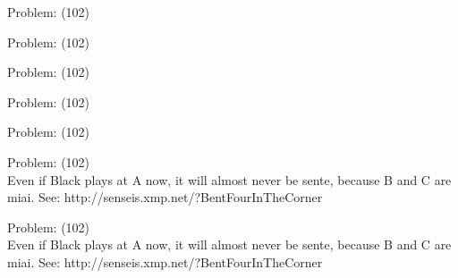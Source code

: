 \documentclass[11pt]{article}
\begin{document}
\begin{minipage}[t]{0.5\textwidth}
  {\centering
  
Problem: (102)\\
  }
\end{minipage}
\begin{minipage}[t]{0.5\textwidth}
  {\centering
  
Problem: (102)\\
  }
\end{minipage}
\begin{minipage}[t]{0.5\textwidth}
  {\centering
  
Problem: (102)\\
  }
\end{minipage}
\begin{minipage}[t]{0.5\textwidth}
  {\centering
  
Problem: (102)\\
  }
\end{minipage}
\begin{minipage}[t]{0.5\textwidth}
  {\centering
  
Problem: (102)\\
  }
\end{minipage}
\begin{minipage}[t]{0.5\textwidth}
  {\centering
  
Problem: (102)\\
Even if Black plays at A now, it will almost never be sente, because B and C are miai. See: http://senseis.xmp.net/?BentFourInTheCorner\\
  }
\end{minipage}
\begin{minipage}[t]{0.5\textwidth}
  {\centering
  
Problem: (102)\\
Even if Black plays at A now, it will almost never be sente, because B and C are miai. See: http://senseis.xmp.net/?BentFourInTheCorner\\
  }
\end{minipage}
\end{document}

